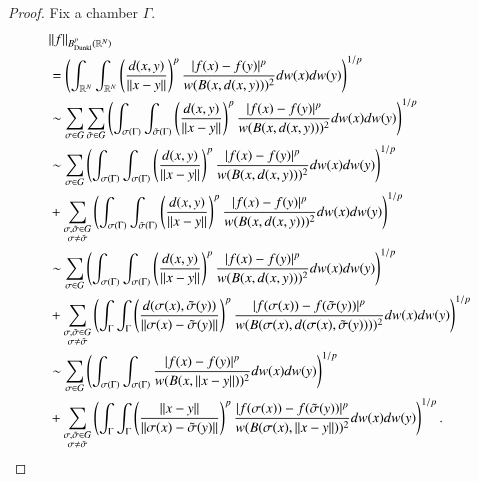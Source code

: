 \documentclass[12pt]{amsart}
\begin{document}
\begin{proof}
Fix a chamber $\Gamma$.
\begin{align*}
&\|f\|_{B^{p}_{{\rm Dunkl}}(\mathbb{R}^N)}\\
&=\left(\int_{\mathbb{R}^{N}}\int_{\mathbb{R}^{N}}\left(\frac{d(x,y)}{\|x-y\|}\right)^{p}\frac{|f(x)-f(y)|^p}{w(B(x,d(x,y)))^2}dw(x)dw(y)\right)^{1/p}\\
&\sim \sum_{\sigma\in G}\sum_{\tilde{\sigma}\in G}\left(\int_{\sigma(\Gamma)}\int_{\tilde{\sigma}(\Gamma)}\left(\frac{d(x,y)}{\|x-y\|}\right)^{p}\frac{|f(x)-f(y)|^p}{w(B(x,d(x,y)))^2}dw(x)dw(y)\right)^{1/p}\\
&\sim  \sum_{\sigma\in G} \left(\int_{\sigma(\Gamma)}\int_{\sigma(\Gamma)}\left(\frac{d(x,y)}{\|x-y\|}\right)^{p}\frac{|f(x)-f(y)|^p}{w(B(x,d(x,y)))^2}dw(x)dw(y)\right)^{1/p}\\
&+\sum_{\substack{\sigma,\tilde{\sigma}\in G\\\sigma\neq \tilde{\sigma}}}\left(\int_{\sigma(\Gamma)}\int_{\tilde{\sigma}(\Gamma)}\left(\frac{d(x,y)}{\|x-y\|}\right)^{p}\frac{|f(x)-f(y)|^p}{w(B(x,d(x,y)))^2}dw(x)dw(y)\right)^{1/p}\\
&\sim  \sum_{\sigma\in G} \left(\int_{\sigma(\Gamma)}\int_{\sigma(\Gamma)}\left(\frac{d(x,y)}{\|x-y\|}\right)^{p}\frac{|f(x)-f(y)|^p}{w(B(x,d(x,y)))^2}dw(x)dw(y)\right)^{1/p}\\
&+\sum_{\substack{\sigma,\tilde{\sigma}\in G\\\sigma\neq \tilde{\sigma}}}\left(\int_{\Gamma}\int_{\Gamma}\left(\frac{d(\sigma(x),\tilde{\sigma}(y))}{\|\sigma(x)-\tilde{\sigma}(y)\|}\right)^{p}\frac{|f(\sigma(x))-f(\tilde{\sigma}(y))|^p}{w(B(\sigma(x),d(\sigma(x),\tilde{\sigma}(y))))^2}dw(x)dw(y)\right)^{1/p}\\
&\sim  \sum_{\sigma\in G} \left(\int_{\sigma(\Gamma)}\int_{\sigma(\Gamma)}\frac{|f(x)-f(y)|^p}{w(B(x,\|x-y\|))^2}dw(x)dw(y)\right)^{1/p}\\
&+\sum_{\substack{\sigma,\tilde{\sigma}\in G\\ \sigma\neq \tilde{\sigma}}}\left(\int_{\Gamma}\int_{\Gamma}\left(\frac{\|x-y\|}{\|\sigma(x)-\tilde{\sigma}(y)\|}\right)^{p}\frac{|f(\sigma(x))-f(\tilde{\sigma}(y))|^p}{w(B(\sigma(x),\|x-y\|))^2}dw(x)dw(y)\right)^{1/p}.
\end{align*}
\end{proof}
\end{document}
